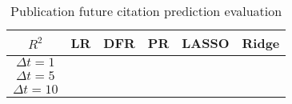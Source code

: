 \begin{table}[!h]
\begin{center}
\begin{tabular}{c|c|c|c|c|c}
\hline
$R^2$& LR & DFR & PR & LASSO & Ridge\\
\hline
$\Delta t=1$ & & & & &\\
\hline
$\Delta t=5$ & & & & &\\
\hline
$\Delta t=10$ & & & & &\\
\hline
\end{tabular}
\end{center}
\caption{Publication future citation prediction evaluation}
\label{tbl-pubprediction}

\end{table}